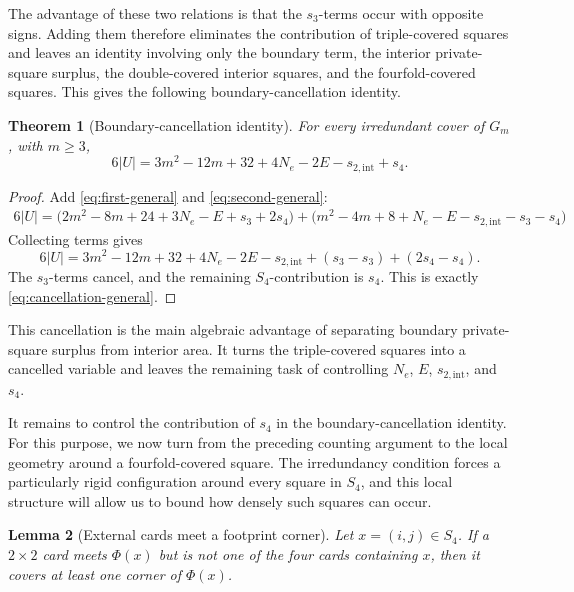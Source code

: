 \documentclass[11pt]{article}
\newtheorem{theorem}{Theorem}[section]
\newtheorem{lemma}[theorem]{Lemma}
\begin{document}
	The advantage of these two relations is that the \(s_3\)-terms occur with opposite signs. Adding them therefore eliminates the contribution of triple-covered squares and leaves an identity involving only the boundary term, the interior private-square surplus, the double-covered interior squares, and the fourfold-covered squares. This gives the following boundary-cancellation identity.
	
	\begin{theorem}[Boundary-cancellation identity]
		For every irredundant cover of \(G_m\), with \(m\ge3\),
		\begin{equation}
			{
				6|U|
				=
				3m^2-12m+32+4N_e-2E-s_{2,\mathrm{int}}+s_4.
			}
			\label{eq:cancellation-general}
		\end{equation}
	\end{theorem}
	
	\begin{proof}
		Add \eqref{eq:first-general} and \eqref{eq:second-general}:
		\[
		\begin{aligned}
			6|U|
			=
			\bigl(2m^2-8m+24+3N_e-E+s_3+2s_4\bigr)
			+
			\bigl(m^2-4m+8+N_e-E-s_{2,\mathrm{int}}-s_3-s_4\bigr)
		\end{aligned}
		\]
		Collecting terms gives
		\[
		6|U|
		=
		3m^2-12m+32+4N_e-2E
		-s_{2,\mathrm{int}}+(s_3-s_3)+(2s_4-s_4).
		\]
		The \(s_3\)-terms cancel, and the remaining \(S_4\)-contribution is \(s_4\).
		This is exactly \eqref{eq:cancellation-general}.
	\end{proof}
	
	This cancellation is the main algebraic advantage of separating boundary
	private-square surplus from interior area.  It turns the triple-covered squares
	into a cancelled variable and leaves the remaining task of controlling
	\(N_e\), \(E\), \(s_{2,\mathrm{int}}\), and \(s_4\).
	
	
	It remains to control the contribution of \(s_4\) in the boundary-cancellation identity. For this purpose, we now turn from the preceding counting argument to the local geometry around a fourfold-covered square. The irredundancy condition forces a particularly rigid configuration around every square in \(S_4\), and this local structure will allow us to bound how densely such squares can occur.
	
	
	\begin{lemma}[External cards meet a footprint corner]
		\label{lem:external-footprint-card}
		Let \(x=(i,j)\in S_4\).  If a \(2\times2\) card meets \(\Phi(x)\) but is not one
		of the four cards containing \(x\), then it covers at least one corner of
		\(\Phi(x)\). 
	\end{lemma}
	
\end{document}
